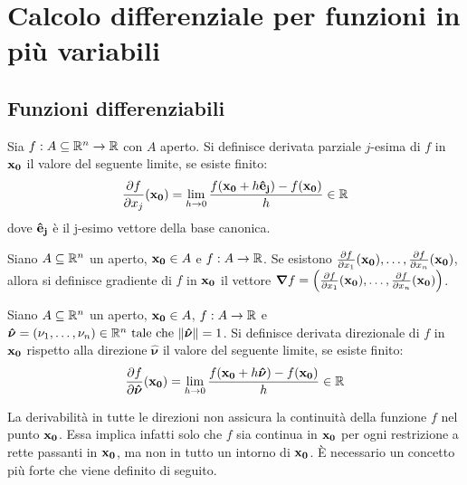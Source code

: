 \chapter{Calcolo differenziale per funzioni in più variabili}

\section{Funzioni differenziabili}

\begin{definition}
    Sia $f: A \subseteq \mathbb{R}^n \to \mathbb{R}$ con $A$ aperto. Si definisce derivata parziale $j$-esima di $f$ in $\vb{x_0}$ il valore del seguente limite, se esiste finito:
    $$
        \frac{\partial f}{\partial x_j} (\vb{x_0}) = \displaystyle \lim_{h\to 0} \frac{f(\vb{x_0} + h\vb{\hat{e}_j}) - f(\vb{x_0})}{h} \in \mathbb{R}
    $$
    dove $\vb{\hat{e}_j}$ è il j-esimo vettore della base canonica.
\end{definition}

\begin{definition}
    [Gradiente]
    Siano $A \subseteq \mathbb{R}^n$ un aperto, $\vb{x_0} \in A$ e $f:A \to \mathbb{R}$. Se esistono $\frac{\partial f}{\partial x_1}(\vb{x_0}),\dots,\\\frac{\partial f}{\partial x_n}(\vb{x_0})$, allora si definisce gradiente di $f$ in $\vb{x_0}$ il vettore $\bm{\nabla}f = \left( \frac{\partial f}{\partial x_1} (\vb{x_0}), \dots, \frac{\partial f}{\partial x_n}(\vb{x_0}) \right)$.
\end{definition}

\begin{definition}
    Siano $A \subseteq \mathbb{R}^n$ un aperto, $\vb{x_0} \in A$, $f:A \to \mathbb{R}$ e $\bm{\hat{\nu}} = (\nu_1,\dots,\nu_n) \in \mathbb{R}^n \text{ tale che } \norm{\bm{\hat{\nu}}}=1$. Si definisce derivata direzionale di $f$ in $\vb{x_0}$ rispetto alla direzione $\bm{\hat{\nu}}$ il valore del seguente limite, se esiste finito:
    $$
        \frac{\partial f}{\partial \bm{\hat{\nu}}} (\vb{x_0}) = \displaystyle \lim_{h\to 0} \frac{f(\vb{x_0} + h\bm{\hat{\nu}}) - f(\vb{x_0})}{h} \in \mathbb{R}
    $$
\end{definition}

\begin{remark}
    La derivabilità in tutte le direzioni non assicura la continuità della funzione $f$ nel punto $\vb{x_0}$. Essa implica infatti solo che $f$ sia continua in $\vb{x_0}$ per ogni restrizione a rette passanti in $\vb{x_0}$, ma non in tutto un intorno di $\vb{x_0}$. È necessario un concetto più forte che viene definito di seguito.
\end{remark}

